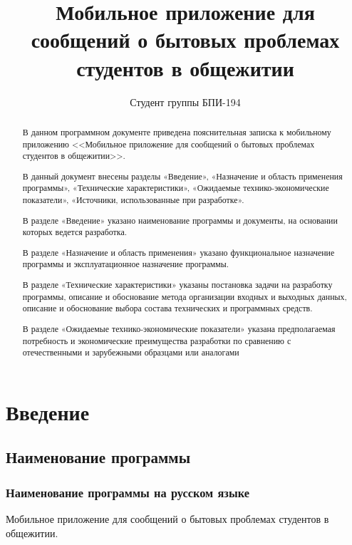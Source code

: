 \documentclass{../includes/TechDoc}
\title{Мобильное приложение для сообщений о бытовых проблемах студентов в общежитии}
\author{Студент группы БПИ-194}{В. А. Анненков}
\begin{document}
    \maketitle

    \begin{abstract}
        В данном программном документе приведена пояснительная записка к мобильному приложению <<Мобильное приложение для сообщений о бытовых проблемах студентов в общежитии>>.

        В данный документ внесены разделы «Введение», «Назначение и область применения программы», «Технические характеристики», «Ожидаемые технико-экономические показатели», «Источники, использованные при разработке».

        В разделе «Введение» указано наименование программы и документы, на основании которых ведется разработка.

        В разделе «Назначение и область применения» указано функциональное назначение программы и эксплуатационное назначение программы.

        В разделе «Технические характеристики» указаны постановка задачи на разработку программы, описание и обоснование метода организации входных и выходных данных, описание и обоснование выбора состава технических и программных средств.

        В разделе «Ожидаемые технико-экономические показатели» указана предполагаемая потребность и экономические преимущества разработки по сравнению с отечественными и зарубежными образцами или аналогами
    \end{abstract}

    \newpage

    \tableofcontents


    \section{Введение}

    \subsection{Наименование программы}

    \subsubsection{Наименование программы на русском языке}

    Мобильное приложение для сообщений о бытовых проблемах студентов в общежитии.
\end{document}
